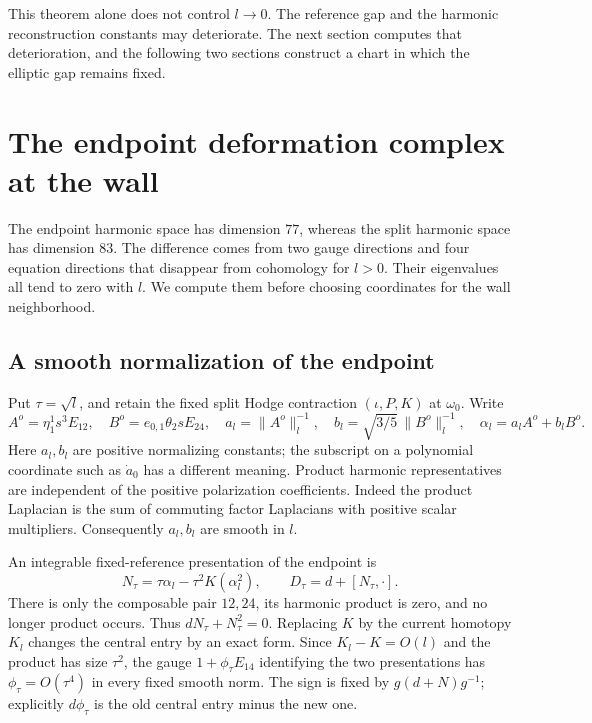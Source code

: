 \documentclass[11pt]{amsart}
\theoremstyle{definition}
\theoremstyle{remark}
\begin{document}
This theorem alone does not control $l\to0$. The reference gap and
the harmonic reconstruction constants may deteriorate. The next
section computes that deterioration, and the following two sections
construct a chart in which the elliptic gap remains fixed.

\section{The endpoint deformation complex at the wall}\label{sec:wall-complex}

The endpoint harmonic space has dimension $77$, whereas the split
harmonic space has dimension $83$. The difference comes from two gauge
directions and four equation directions that disappear from cohomology
for $l>0$. Their eigenvalues all tend to zero with $l$. We compute them
before choosing coordinates for the wall neighborhood.

\subsection{A smooth normalization of the endpoint}
Put $\tau=\sqrt l$, and retain the fixed split Hodge contraction
$(\iota,P,K)$ at $\omega_0$. Write
\begin{equation}\label{eq:endpoint-path}
 A^o=\eta_1^1s^3E_{12},\quad B^o=e_{0,1}\theta_2sE_{24},\quad
 a_l=\|A^o\|_l^{-1},\quad b_l=\sqrt{3/5}\,\|B^o\|_l^{-1},\quad
 \alpha_l=a_lA^o+b_lB^o.
\end{equation}
Here $a_l,b_l$ are positive normalizing constants; the subscript on a
polynomial coordinate such as $\dot a_0$ has a different meaning.
Product harmonic representatives are independent of the positive
polarization coefficients. Indeed the product Laplacian is the sum
of commuting factor Laplacians with positive scalar multipliers.
Consequently $a_l,b_l$ are smooth in $l$.

An integrable fixed-reference presentation of the endpoint is
\begin{equation}\label{eq:wall-endpoint-operator}
 N_\tau=\tau\alpha_l-\tau^2K(\alpha_l^2),\qquad
 D_\tau=d+[N_\tau,\cdot].
\end{equation}
There is only the composable pair $12,24$, its harmonic product is
zero, and no longer product occurs. Thus $dN_\tau+N_\tau^2=0$.
Replacing $K$ by the current homotopy $K_l$ changes the central
entry by an exact form. Since $K_l-K=O(l)$ and the product has
size $\tau^2$, the gauge $1+\phi_\tau E_{14}$ identifying the two
presentations has $\phi_\tau=O(\tau^4)$ in every fixed smooth norm.
The sign is fixed by $g(d+N)g^{-1}$; explicitly $d\phi_\tau$ is
the old central entry minus the new one.
\end{document}
